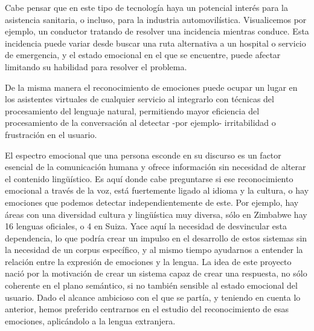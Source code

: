 \documentclass[11pt,a4paper,spanish]{book}
\begin{document}
	Cabe pensar que en este tipo de tecnología haya un potencial interés para la asistencia sanitaria, o incluso, para la industria automovilística. Visualicemos por ejemplo, un conductor tratando de resolver una incidencia mientras conduce. Esta incidencia puede variar desde buscar una ruta alternativa a un hospital o servicio de emergencia, y el estado emocional en el que se encuentre, puede afectar limitando su habilidad para resolver el problema. 
	
	De la misma manera el reconocimiento de emociones puede ocupar un lugar en los asistentes virtuales de cualquier servicio al integrarlo con técnicas del procesamiento del lenguaje natural, permitiendo mayor eficiencia del procesamiento de la conversación al detectar -por ejemplo-  irritabilidad o frustración en el usuario. 
	
	El espectro emocional que una persona esconde en su discurso es un factor esencial de la comunicación humana y ofrece información sin necesidad de alterar el contenido lingüístico. Es aquí donde cabe preguntarse si ese reconocimiento emocional a través de la voz, está fuertemente ligado al idioma y la cultura, o hay emociones que podemos detectar independientemente de este. Por ejemplo, hay áreas con una diversidad cultura y lingüística muy diversa, sólo en Zimbabwe hay 16 lenguas oficiales, o 4 en Suiza. Yace aquí la necesidad de desvincular esta dependencia, lo que podría crear un impulso en el desarrollo de estos sistemas sin la necesidad de un corpus específico, y al mismo tiempo ayudarnos a entender la relación entre la expresión de emociones y la lengua.
	La idea de este proyecto nació por la motivación de crear un sistema capaz de crear una respuesta, no sólo coherente en el plano semántico, si no también sensible al estado emocional del usuario. Dado el alcance ambicioso con el que se partía, y teniendo en cuenta lo anterior, hemos preferido centrarnos en el estudio del reconocimiento de esas emociones, aplicándolo a la lengua extranjera.
 
\end{document}
